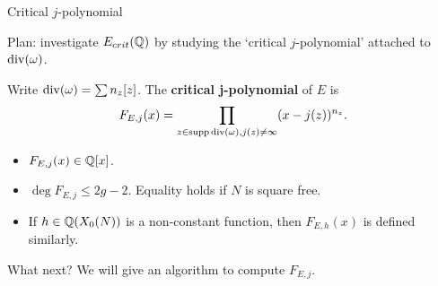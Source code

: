 \documentclass[handout]{beamer}
\begin{document}
\begin{frame}{Critical $j$-polynomial}




Plan: investigate $E_{crit}(\mathbb{Q})$ by studying the `critical $j$-polynomial' attached to $\operatorname{div}(\omega)$. 

\pause 
\begin{Def}
Write $\operatorname{div}(\omega) = \sum n_z[z]$. The \textbf{critical j-polynomial} of $E$ is 
\[
F_{E,j}(x) = \prod_{z \in \operatorname{supp} \operatorname{div}(\omega), j(z) \neq \infty}(x-j(z))^{n_z}.
\]
\end{Def}

\pause 
\begin{itemize}
\item $F_{E,j}(x) \in \mathbb{Q}[x]$.
\item $\deg F_{E,j} \leq 2g-2$. Equality holds if $N$ is square free.
\item If $h \in \mathbb{Q}(X_0(N))$ is a non-constant function, then
$F_{E,h}(x)$ is defined similarly.						
\end{itemize}

\pause

What next? We will give an algorithm to compute $F_{E,j}$.

\end{frame}

\end{document}
